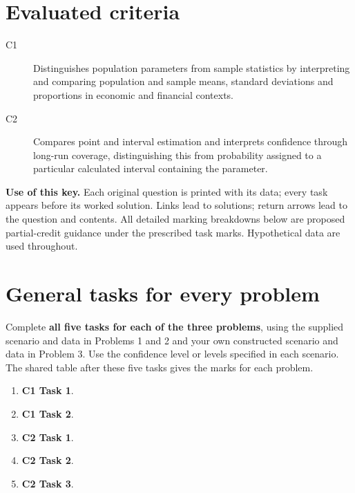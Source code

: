 \section*{Evaluated criteria}
\begin{description}
\item[C1] Distinguishes population parameters from sample statistics by interpreting and comparing population and sample means, standard deviations and proportions in economic and financial contexts.
\item[C2] Compares point and interval estimation and interprets confidence through long-run coverage, distinguishing this from probability assigned to a particular calculated interval containing the parameter.
\end{description}
\clearpage
\textbf{Use of this key.} Each original question is printed with its data; every task appears before its worked solution. Links lead to solutions; return arrows lead to the question and contents. All detailed marking breakdowns below are proposed partial-credit guidance under the prescribed task marks. Hypothetical data are used throughout.
\section*{General tasks for every problem}
Complete \textbf{all five tasks for each of the three problems}, using the supplied scenario and data in Problems 1 and 2 and your own constructed scenario and data in Problem 3. Use the confidence level or levels specified in each scenario. The shared table after these five tasks gives the marks for each problem.
\begin{enumerate}[label=(\alph*),itemsep=1pt]
\item \textbf{C1 Task 1}. \cOneA
\item \textbf{C1 Task 2}. \cOneB
\item \textbf{C2 Task 1}. \cTwoA
\item \textbf{C2 Task 2}. \cTwoB
\item \textbf{C2 Task 3}. \cTwoC
\end{enumerate}



